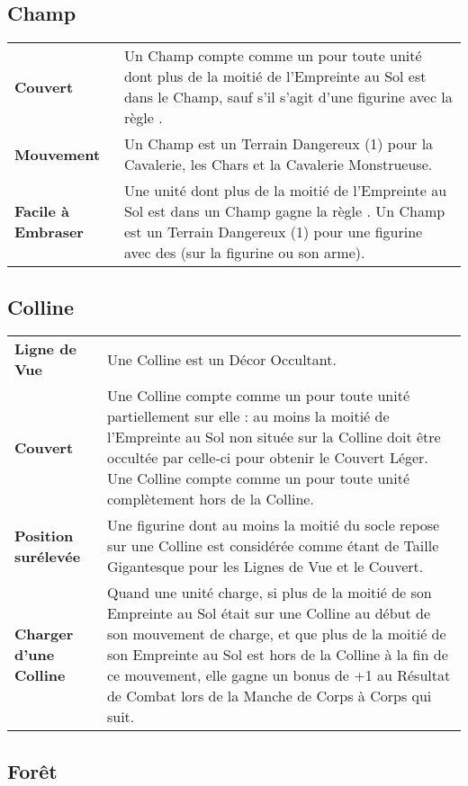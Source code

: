 \hypertarget{fields}{\subsection{Champ}}

\noindent\begin{tabular}{>{\bfseries\raggedleft}p{2.2cm}p{13.5cm}}
Couvert & Un Champ compte comme un \softterrain{} pour toute unité dont plus de la moitié de l'Empreinte au Sol est dans le Champ, sauf s'il s'agit d'une figurine avec la règle \toweringpresence{}. \tabularnewline
Mouvement & Un Champ est un Terrain Dangereux (1) pour la Cavalerie, les Chars et la Cavalerie Monstrueuse. \tabularnewline
Facile à Embraser & Une unité dont plus de la moitié de l'Empreinte au Sol est dans un Champ gagne la règle \flammable{}. Un Champ est un Terrain Dangereux (1) pour une figurine avec des \flamingattacks{} (sur la figurine ou son arme). \tabularnewline
\end{tabular}

\hypertarget{hills}{\subsection{Colline}}

\noindent\begin{tabular}{>{\bfseries\raggedleft}p{2.2cm}p{13.5cm}}
Ligne de Vue & Une Colline est un Décor Occultant. \tabularnewline
Couvert & Une Colline compte comme un \softterrain{} pour toute unité partiellement sur elle : au moins la moitié de l'Empreinte au Sol non située sur la Colline doit être occultée par celle-ci pour obtenir le Couvert Léger.\newline
Une Colline compte comme un \hardterrain{} pour toute unité complètement hors de la Colline. \tabularnewline
Position surélevée & Une figurine dont au moins la moitié du socle repose sur une Colline est considérée comme étant de Taille Gigantesque pour les Lignes de Vue et le Couvert. \tabularnewline
Charger d'une Colline & Quand une unité charge, si plus de la moitié de son Empreinte au Sol était sur une Colline au début de son mouvement de charge, et que plus de la moitié de son Empreinte au Sol est hors de la Colline à la fin de ce mouvement, elle gagne un bonus de +1 au Résultat de Combat lors de la Manche de Corps à Corps qui suit. \tabularnewline
\end{tabular}

\hypertarget{forests}{\subsection{Forêt}}

